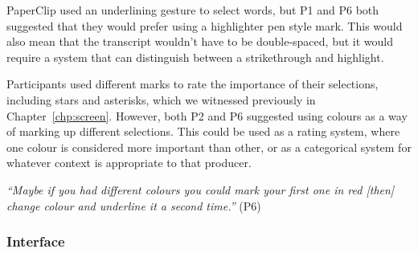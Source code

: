 


PaperClip used an underlining gesture to select words, but P1 and P6 both suggested that they would prefer using a
highlighter pen style mark.  This would also mean that the transcript wouldn't have to be double-spaced, but it would
require a system that can distinguish between a strikethrough and highlight.


Participants used different marks to rate the importance of their selections, including stars and asterisks, which we
witnessed previously in Chapter~\ref{chp:screen}. However, both P2 and P6 suggested using colours as a way of marking
up different selections.  This could be used as a rating system, where one colour is considered more important than
other, or as a categorical system for whatever context is appropriate to that producer.

\textit{``Maybe if you had different colours you could mark your first one in red [then]
change colour and underline it a second time.''} (P6)





\subsubsection{Interface}

